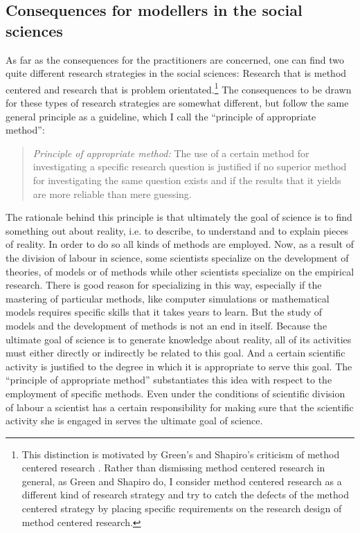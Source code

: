 \documentclass[onecollarge]{STJour}
\numberwithin{equation}{section}
\begin{document}
\subsection{Consequences for modellers in the social sciences}

As far as the consequences for the practitioners are concerned, one can
find two quite different research strategies in the social sciences:
Research that is method centered and research that is problem
orientated.\footnote{This distinction is motivated by Green's and
Shapiro's criticism of method centered research
\citep{green-shapiro:1994, shapiro:2005}. Rather than dismissing method
centered research in general, as Green and Shapiro do, I consider method
centered research as a different kind of research strategy and try to
catch the defects of the method centered strategy by placing specific
requirements on the research design of method centered research.} The
consequences to be drawn for these types of research strategies are
somewhat different, but follow the same general principle as a guideline,
which I call the ``principle of appropriate method'': 

\begin{quote}
{\em Principle of appropriate method:} The use of a
certain method for investigating a specific research question is
justified if no superior method for investigating the same question
exists and if the results that it yields are more reliable than mere
guessing.
\end{quote}

The rationale behind this principle is that ultimately the goal of
science is to find something out about reality, i.e. to describe, to
understand and to explain pieces of reality. In order to do so all kinds
of methods are employed. Now, as a result of the division of labour in
science, some scientists specialize on the development of theories, of
models or of methods while other scientists specialize on the empirical
research. There is good reason for specializing in this way, especially
if the mastering of particular methods, like computer simulations or
mathematical models requires specific skills that it takes years to
learn. But the study of models and the development of methods is not an
end in itself. Because the ultimate goal of science is to generate
knowledge about reality, all of its activities must either directly or
indirectly be related to this goal. And a certain scientific activity is
justified to the degree in which it is appropriate to serve this goal.
The ``principle of appropriate method'' substantiates this idea with
respect to the employment of specific methods. Even under the conditions
of scientific division of labour a scientist has a certain responsibility
for making sure that the scientific activity she is engaged in serves the
ultimate goal of science.
\end{document}
